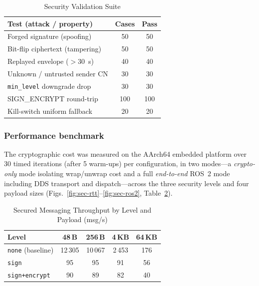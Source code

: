 \documentclass[conference]{IEEEtran}
\begin{document}
\begin{table}[t]
\caption{Security Validation Suite}
\label{tab:sec-tests}
\centering
\footnotesize
\begin{tabular}{@{}p{}cc@{}}
\toprule
\textbf{Test (attack / property)} & \textbf{Cases} & \textbf{Pass} \\
\midrule
Forged signature (spoofing)        & 50 & 50 \\
Bit-flip ciphertext (tampering)    & 50 & 50 \\
Replayed envelope ($>$30~s)        & 40 & 40 \\
Unknown / untrusted sender CN      & 30 & 30 \\
\texttt{min\_level} downgrade drop & 30 & 30 \\
SIGN\_ENCRYPT round-trip           & 100 & 100 \\
Kill-switch uniform fallback       & 20 & 20 \\
\bottomrule
\end{tabular}
\end{table}

\subsubsection{Performance benchmark}
The cryptographic cost was measured on the AArch64 embedded platform over
\num{30} timed iterations (after \num{5} warm-ups) per configuration, in two
modes---a \emph{crypto-only} mode isolating wrap/unwrap cost and a full
\emph{end-to-end} ROS~2 mode including DDS transport and dispatch---across the
three security levels and four payload sizes
(Figs.~\ref{fig:sec-rtt}--\ref{fig:sec-ros2}, Table~\ref{tab:sec-throughput}).

\begin{table}[t]
\caption{Secured Messaging Throughput by Level and Payload (msg/s)}
\label{tab:sec-throughput}
\centering
\footnotesize
\begin{tabular}{@{}lcccc@{}}
\toprule
\textbf{Level} & \textbf{48\,B} & \textbf{256\,B} & \textbf{4\,KB} & \textbf{64\,KB} \\
\midrule
\texttt{none} (baseline) & 12\,305 & 10\,067 & 2\,453 & 176 \\
\texttt{sign}            & 95 & 95 & 91 & 56 \\
\texttt{sign+encrypt}    & 90 & 89 & 82 & 40 \\
\bottomrule
\end{tabular}
\end{table}
\end{document}
